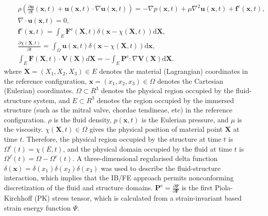 \documentclass[fleqn,10pt]{wlscirep}
\begin{document}
\begin{eqnarray}
&&\rho \left( {\frac{{\partial {\mathbf{u}}}}{{\partial t}}\left( {{\mathbf{x}},t} \right) + {\mathbf{u}}\left( {{\mathbf{x}},t} \right) \cdot \nabla {\mathbf{u}}\left( {{\mathbf{x}},t} \right)} \right) =  - \nabla p\left( {{\mathbf{x}},t} \right) + \mu {\nabla ^2}{\mathbf{u}}\left( {{\mathbf{x}},t} \right) + {{\mathbf{f}}^{\text{e}}}\left( {{\mathbf{x}},t} \right),\\
&&\nabla  \cdot {\mathbf{u}}\left( {{\mathbf{x}},t} \right) = 0,\\
&&{{\mathbf{f}}^{\text{e}}}\left( {{\mathbf{x}},t} \right){\text{ = }}\int_E {{{\mathbf{F}}^{\text{e}}}\left( {{\mathbf{X}},t} \right)\delta \left( {{\mathbf{x}} - \chi \left( {{\mathbf{X}},t} \right)} \right){\text{d}}{\mathbf{X}}},\\
&&\frac{{\partial \chi \left( {{\mathbf{X}},t} \right)}}{{\partial t}}{\text{ = }}\int_\Omega  {{\mathbf{u}}\left( {{\mathbf{x}},t} \right)\delta \left( {{\mathbf{x}} - \chi \left( {{\mathbf{X}},t} \right)} \right){\text{d}}{\mathbf{x}}},\\
&&\int_{E}\mathbf{F}(\mathbf{X},t)\cdot\mathbf{V}(\mathbf{X})d\mathbf{X}=-\int_{E}\mathbf{P}^{\mathrm{e}}:\nabla \mathbf{V}(\mathbf{X}){\text{d}}\mathbf{X}.
\label{FC}
\end{eqnarray}
where ${\mathbf{X}} = (X_{1},X_{2},X_{3}) \in E$ denotes the material (Lagrangian) coordinates in the reference configuration, ${\mathbf{x}} = (x_{1},x_{2},x_{3})\in\Omega$ denotes the Cartesian (Eulerian) coordinates. $\Omega \subset R^{3}$ denotes the physical region occupied by the fluid-structure system, and $E \subset R^{3}$ denotes the region occupied by the immersed structure (such as the mitral valve, chordae tendineae, etc) in the reference configuration. $\rho$ is the fluid density, $p({\mathbf{x}}, t)$ is the Eulerian pressure, and $\mu$ is the viscosity.  $\chi ({\mathbf{X}},t)\in\Omega$ gives the physical position of material point ${\mathbf{X}}$ at time $t$. Therefore, the physical region occupied by the structure at time $t$ is $\Omega^{e}(t)=\chi(E,t)$, and the physical domain occupied by the fluid at time $t$ is $\Omega^{f}(t)=\Omega-\Omega^{e}(t)$. A three-dimensional regularised delta function $\delta({\mathbf{x}}) = \delta(x_{1}) \delta(x_{2}) \delta(x_{3})$ was used to describe the fluid-structure interaction, which implies that the IB/FE approach permits nonconforming discretization of the fluid and structure domains. $\mathbf{P}^{\text{e}}=\frac{\partial \Psi}{\partial \mathbf{F}}$ is the first Piola-Kirchhoff (PK) stress tensor, which is calculated from  a strain-invariant based strain energy function $\Psi$.
\end{document}
